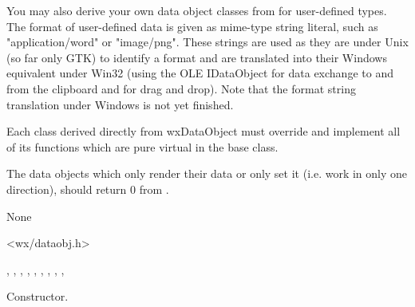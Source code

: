 You may also derive your own data object classes from 
 for user-defined types. The
format of user-defined data is given as mime-type string literal, such as
"application/word" or "image/png". These strings are used as they are under
Unix (so far only GTK) to identify a format and are translated into their
Windows equivalent under Win32 (using the OLE IDataObject for data exchange to
and from the clipboard and for drag and drop). Note that the format string
translation under Windows is not yet finished.




Each class derived directly from wxDataObject must override and implement all
of its functions which are pure virtual in the base class.

The data objects which only render their data or only set it (i.e. work in
only one direction), should return 0 from 
.


None


<wx/dataobj.h>


, 
, 
, 
, 
, 
, 
, 
, 
, 


\label{wxdataobjectwxdataobject}


Constructor.

\label{wxdataobjectdtor}

